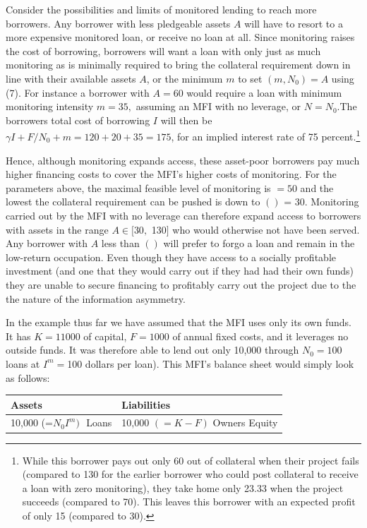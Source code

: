 \documentclass[
]{article}
\begin{document}
Consider the possibilities and limits of monitored lending to reach more
borrowers. Any borrower with less pledgeable assets \(A\) will have to
resort to a more expensive monitored loan, or receive no loan at all.
Since monitoring raises the cost of borrowing, borrowers will want a
loan with only just as much monitoring as is minimally required to bring
the collateral requirement down in line with their available assets
\(A\), or the minimum \(m\) to set \((m,N_{0}) = A\) using (7). For
instance a borrower with \(A = 60\) would require a loan with minimum
monitoring intensity \(m = 35,\) assuming an MFI with no leverage, or
\(N = N_{0}\).The borrowers total cost of borrowing \(I\) will then be
\(\gamma I + F/N_{0} + m = 120 + 20 + 35 = 175\), for an implied
interest rate of 75 percent.\footnote{While this borrower pays out only
  60 out of collateral when their project fails (compared to 130 for the
  earlier borrower who could post collateral to receive a loan with zero
  monitoring), they take home only 23.33 when the project succeeds
  (compared to 70). This leaves this borrower with an expected profit of
  only 15 (compared to 30).}

Hence, although monitoring expands access, these asset-poor borrowers
pay much higher financing costs to cover the MFI's higher costs of
monitoring. For the parameters above, the maximal feasible level of
monitoring is \(= 50\) and the lowest the collateral requirement can be
pushed is down to \(()\) = 30. Monitoring carried out by the MFI with no
leverage can therefore expand access to borrowers with assets in the
range \(A \in \lbrack\)30\(,\) 130\(\rbrack\) who would otherwise not
have been served. Any borrower with \(A\) less than \(()\) will prefer
to forgo a loan and remain in the low-return occupation. Even though
they have access to a socially profitable investment (and one that they
would carry out if they had had their own funds) they are unable to
secure financing to profitably carry out the project due to the the
nature of the information asymmetry.

In the example thus far we have assumed that the MFI uses only its own
funds. It has \(K = 11000\) of capital, \(F = 1000\) of annual fixed
costs, and it leverages no outside funds. It was therefore able to lend
out only 10,000 through \(N_{0} = 100\) loans at \(I^{m} =\)100 dollars
per loan). This MFI's balance sheet would simply look as follows:

\begin{longtable}[]{@{}ll@{}}
\toprule
\textbf{Assets} & \textbf{Liabilities}\tabularnewline
\midrule
\endhead
10,000 (=\(N_{0}I^{m})\mspace{6mu}\) Loans & 10,000 \(( = K - F)\)
Owners Equity\tabularnewline
\bottomrule
\end{longtable}
\end{document}
